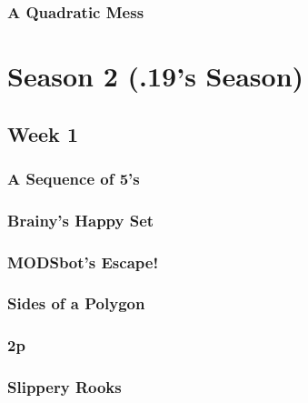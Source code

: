 \documentclass[titlepage=true]{scrartcl}
\begin{document}
        \subsubsection{A Quadratic Mess}
            \label{1-2-7}
            
        \newpage

\section{Season 2 (.19's Season)}

    \subsection{Week 1}

        \subsubsection{A Sequence of 5's}
            \label{2-1-1}
            
        \newpage

        \subsubsection{Brainy's Happy Set}
            \label{2-1-2}
            
        \newpage
       
        \subsubsection{MODSbot's Escape!}
            \label{2-1-3}
                    
        \newpage 

        \subsubsection{Sides of a Polygon}
            \label{2-1-4}
            
        \newpage 

        \subsubsection{2p}
            \label{2-1-5}
            
        \newpage

        \subsubsection{Slippery Rooks}
            \label{2-1-6}
            
        \newpage
            
\end{document}
